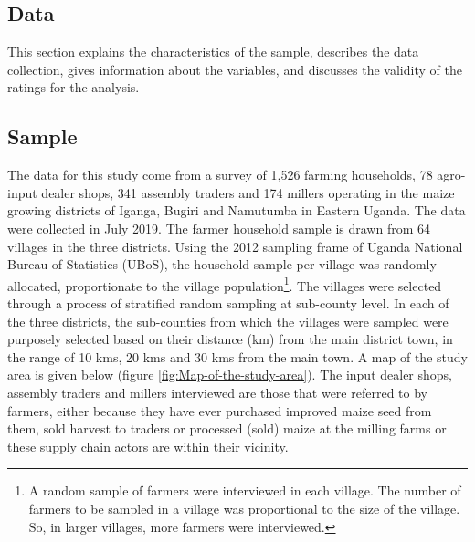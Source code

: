 \documentclass[12pt,english]{article}\usepackage[]{graphicx}\usepackage[]{color}
\begin{document}
\begin{onehalfspace}
\newpage{}
\end{onehalfspace}
\begin{onehalfspace}

\section{Data\label{sec:Data}}
\end{onehalfspace}

This section explains the characteristics of the sample, describes
the data collection, gives information about the variables, and discusses
the validity of the ratings for the analysis.
\begin{onehalfspace}

\subsection{Sample\label{subsec:Sample}}
\end{onehalfspace}

\begin{onehalfspace}
The data for this study come from a survey of 1,526 farming households,
78 agro-input dealer shops, 341 assembly traders and 174 millers operating
in the maize growing districts of Iganga, Bugiri and Namutumba in
Eastern Uganda. The data were collected in July 2019. The farmer household
sample is drawn from 64 villages in the three districts. Using the
2012 sampling frame of Uganda National Bureau of Statistics (UBoS),
the household sample per village was randomly allocated, proportionate
to the village population\footnote{A random sample of farmers were interviewed in each village. The number
of farmers to be sampled in a village was proportional to the size
of the village. So, in larger villages, more farmers were interviewed. }. The villages were selected through a process of stratified random
sampling at sub-county level. In each of the three districts, the
sub-counties from which the villages were sampled were purposely selected
based on their distance (km) from the main district town, in the range
of 10 kms, 20 kms and 30 kms from the main town. A map of the study
area is given below (figure \ref{fig:Map-of-the-study-area}). The
input dealer shops, assembly traders and millers interviewed are those
that were referred to by farmers, either because they have ever purchased
improved maize seed from them, sold harvest to traders or processed
(sold) maize at the milling farms or these supply chain actors are
within their vicinity.
\end{onehalfspace}
\end{document}
